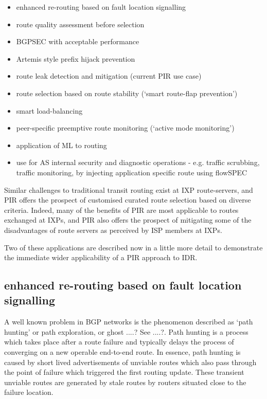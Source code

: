 \begin{itemize}
	\item enhanced re-routing based on fault location signalling
	\item route quality assessment before selection
	\item BGPSEC with acceptable performance
	\item Artemis style prefix hijack prevention
	\item route leak detection and mitigation (current PIR use case)
	\item route selection based on route stability (‘smart route-flap prevention’)
	\item smart load-balancing
	\item peer-specific preemptive route monitoring (‘active mode monitoring’)
	\item application of ML to routing
	\item use for AS internal security and diagnostic operations - e.g. traffic scrubbing, traffic monitoring, by injecting application specific route using flowSPEC
\end{itemize}
Similar challenges to traditional transit routing exist at IXP route-servers, and PIR offers the prospect of customised curated route selection based on diverse criteria. Indeed, many of the benefits of PIR are most applicable to routes exchanged at IXPs, and PIR also offers the prospect of mitigating some of the disadvantages of route servers as perceived by ISP members at IXPs.

Two of these applications are described now in a little more detail to demonstrate the immediate wider applicability of a PIR approach to IDR.

\subsection{enhanced re-routing based on fault location signalling}

A well known problem in BGP networks is the phenomenon described as ‘path hunting’ or path exploration, or ghost ....? See ....?. Path hunting is a process which takes place after a route failure and typically delays the process of converging on a new operable end-to-end route. In essence, path hunting is caused by short lived advertisements of unviable routes which also pass through the point of failure which triggered the first routing update. These transient unviable routes are generated by stale routes by routers situated close to the failure location.

